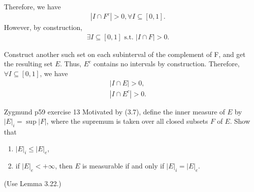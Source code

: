 \documentclass[UTF8,a4paper,10pt]{article}
\begin{document}
\begin{solution}\,

Therefore, we have
\begin{equation*}
  \begin{aligned}
    |I\cap F^c| > 0,  \forall I\subseteq[0,1] .
  \end{aligned}
\end{equation*}
However, by construction,
\begin{equation*}
  \begin{aligned}
    \exists I\subseteq[0,1]\text{ s.t. }|I\cap F| > 0.
  \end{aligned}
\end{equation*}

Construct another such set on each subinterval of the complement of F, and get the resulting set \(E\). Thus, \(E^c\) contains no intervals by construction. Therefore, \(\forall I\subseteq[0,1]\), we have
\begin{equation*}
  \begin{aligned}
    |I\cap E| > 0,\\
    |I\cap E^c| > 0.
  \end{aligned}
\end{equation*}

\end{solution}


\pagebreak
\begin{Problem}[]{Zygmund p59 exercise 13}
  Motivated by (3.7), define the inner measure of $E$ by $|E|_i = \sup |F|$, where
  the supremum is taken over all closed subsets $F$ of $E$. Show that
  \begin{enumerate}
    \item $|E|_i \leq |E|_e$,
    \item if $|E|_e < +\infty$, then $E$ is measurable if and only if $|E|_i = |E|_e$.
  \end{enumerate}
  (Use Lemma 3.22.)

\end{Problem}
\end{document}
